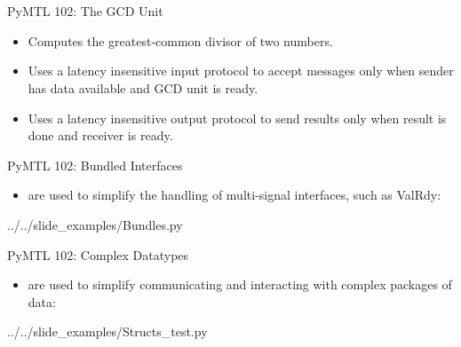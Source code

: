 
\section[{\it Hands-On} GCD Unit]{}

\begin{frame}{PyMTL 102: The GCD Unit}
\begin{itemize}
  \item Computes the greatest-common divisor of two numbers.
  \smallskip
  \item Uses a latency insensitive input protocol to accept messages only
        when sender has data available and GCD unit is ready.
  \smallskip
  \item Uses a latency insensitive output protocol to send results only
        when result is done and receiver is ready.
\end{itemize}

\end{frame}

\begin{frame}{PyMTL 102: Bundled Interfaces}

\begin{itemize}
  \item {} are used to simplify the handling of multi-signal
        interfaces, such as ValRdy:
\end{itemize}

\vspace{-0.15in}

{../../slide_examples/Bundles.py}

\end{frame}

\begin{frame}{PyMTL 102: Complex Datatypes}

\begin{itemize}
  \item {} are used to simplify communicating and interacting
        with complex packages of data:
\end{itemize}

\vspace{-0.15in}

{../../slide_examples/Structs_test.py}

\end{frame}

